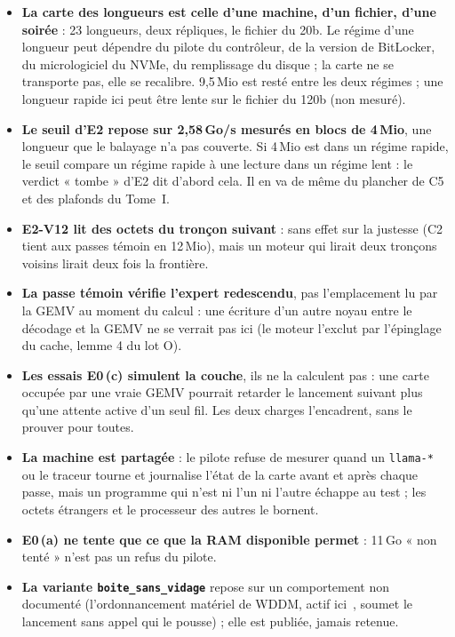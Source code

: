 \begin{faux}
\begin{itemize}
\item \textbf{La carte des longueurs est celle d'une machine, d'un fichier, d'une soirée} : 23 longueurs, deux répliques, le fichier du 20b. Le régime d'une longueur peut dépendre du pilote du contrôleur, de la version de BitLocker, du micrologiciel du NVMe, du remplissage du disque ; la carte ne se transporte pas, elle se recalibre. 9,5\,Mio est resté entre les deux régimes ; une longueur rapide ici peut être lente sur le fichier du 120b (non mesuré).
\item \textbf{Le seuil d'E2 repose sur 2,58\,Go/s mesurés en blocs de 4\,Mio}, une longueur que le balayage n'a pas couverte. Si 4\,Mio est dans un régime rapide, le seuil compare un régime rapide à une lecture dans un régime lent : le verdict « tombe » d'E2 dit d'abord cela. Il en va de même du plancher de C5 et des plafonds du Tome~I.
\item \textbf{E2-V12 lit des octets du tronçon suivant} : sans effet sur la justesse (C2 tient aux passes témoin en 12\,Mio), mais un moteur qui lirait deux tronçons voisins lirait deux fois la frontière.
\item \textbf{La passe témoin vérifie l'expert redescendu}, pas l'emplacement lu par la GEMV au moment du calcul : une écriture d'un autre noyau entre le décodage et la GEMV ne se verrait pas ici (le moteur l'exclut par l'épinglage du cache, lemme 4 du lot O).
\item \textbf{Les essais E0\,(c) simulent la couche}, ils ne la calculent pas : une carte occupée par une vraie GEMV pourrait retarder le lancement suivant plus qu'une attente active d'un seul fil. Les deux charges l'encadrent, sans le prouver pour toutes.
\item \textbf{La machine est partagée} : le pilote refuse de mesurer quand un \texttt{llama-*} ou le traceur tourne et journalise l'état de la carte avant et après chaque passe, mais un programme qui n'est ni l'un ni l'autre échappe au test ; les octets étrangers et le processeur des autres le bornent.
\item \textbf{E0\,(a) ne tente que ce que la RAM disponible permet} : 11\,Go « non tenté » n'est pas un refus du pilote.
\item \textbf{La variante \texttt{boite\_\allowbreak sans\_\allowbreak vidage}} repose sur un comportement non documenté (l'ordonnancement matériel de WDDM, actif ici~\cite{pronovost2020hags}, soumet le lancement sans appel qui le pousse) ; elle est publiée, jamais retenue.

\end{itemize}
\end{faux}
